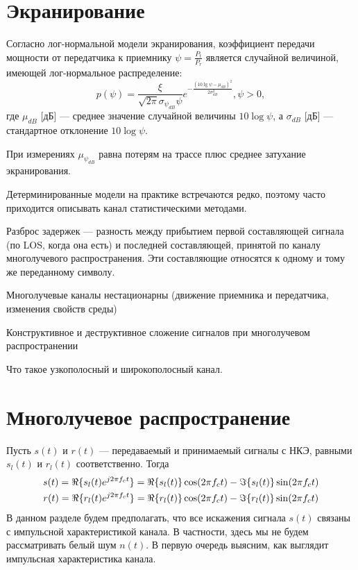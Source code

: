 \documentclass{book}
\numberwithin{theorem}{chapter}
\numberwithin{statement}{chapter}
\numberwithin{lemma}{chapter}
\theoremstyle{definition}
\numberwithin{task}{chapter}
\theoremstyle{remark}
\numberwithin{example}{chapter}
\theoremstyle{definition}
\numberwithin{definition}{chapter}
\theoremstyle{remark}
\theoremstyle{remark}
\numberwithin{lyrics}{section}
\begin{document}
\section{Экранирование}
Согласно лог-нормальной модели экранирования, коэффициент передачи мощности от передатчика к приемнику $\psi = \frac{P_t}{P_r}$
является случайной величиной, имеющей лог-нормальное распределение:
\begin{equation*}
p(\psi) = \frac{\xi}{\sqrt{2\pi}\sigma_{\psi_{dB}}\psi} e^{-\frac{(10 \lg \psi - \mu_{dB})^2}{2\sigma_{dB}^2}}, \psi > 0,
\end{equation*}
где $\mu_{dB}$ [дБ] --- среднее значение случайной величины $10 \log \psi$, а 
$\sigma_{dB}$ [дБ] --- стандартное отклонение $10 \log \psi$.

При измерениях $\mu_{\psi_{dB}}$ равна потерям на трассе плюс среднее затухание экранирования.

Детерминированные модели на практике встречаются редко, поэтому часто приходится описывать канал статистическими методами.

Разброс задержек --- разность между прибытием первой составляющей сигнала (по LOS, когда она есть) и последней составляющей, принятой по каналу многолучевого распространения. Эти составляющие относятся к одному и тому же переданному символу.

Многолучевые каналы нестационарны (движение приемника и передатчика, изменения свойств среды)

Конструктивное и деструктивное сложение сигналов при многолучевом распространении

Что такое узкополосный и широкополосный канал.

\section{Многолучевое распространение}
Пусть $s(t)$ и $r(t)$ --- передаваемый и принимаемый сигналы с НКЭ, равными $s_l(t)$ и $r_l(t)$ соответственно. Тогда
\begin{gather}
s(t) = \Re\{s_l(t) e^{j2\pi f_c t}\} = \Re\{s_l(t)\} \cos(2\pi f_c t) - \Im\{s_l(t)\} \sin(2\pi f_c t) \label{eq:phy:channel_models:s1} \\
r(t) = \Re\{r_l(t) e^{j2\pi f_c t}\} = \Re\{r_l(t)\} \cos(2\pi f_c t) - \Im\{r_l(t)\} \sin(2\pi f_c t) \notag
\end{gather}
В данном разделе будем предполагать, что все искажения сигнала $s(t)$ связаны с импульсной характеристикой канала. В частности, здесь мы не будем рассматривать белый шум $n(t)$. В первую очередь выясним, как выглядит импульсная характеристика канала.
\end{document}
